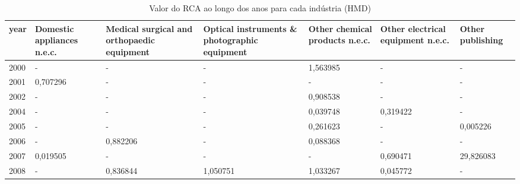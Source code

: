 \begin{table}
\centering
\caption{Valor do RCA ao longo dos anos para cada indústria (HMD)}
\begin{tabular}{p{1cm}p{2cm}p{2cm}p{2cm}p{2cm}p{2cm}p{2cm}}
\toprule
 year &  Domestic appliances n.e.c. &  Medical surgical and orthopaedic equipment &  Optical instruments \& photographic equipment &  Other chemical products n.e.c. &  Other electrical equipment n.e.c. &  Other publishing \\
\midrule
 2000 &                           - &                                           - &                                             - &                        1,563985 &                                  - &                 - \\
 2001 &                    0,707296 &                                           - &                                             - &                               - &                                  - &                 - \\
 2002 &                           - &                                           - &                                             - &                        0,908538 &                                  - &                 - \\
 2004 &                           - &                                           - &                                             - &                        0,039748 &                           0,319422 &                 - \\
 2005 &                           - &                                           - &                                             - &                        0,261623 &                                  - &          0,005226 \\
 2006 &                           - &                                    0,882206 &                                             - &                        0,088368 &                                  - &                 - \\
 2007 &                    0,019505 &                                           - &                                             - &                               - &                           0,690471 &         29,826083 \\
 2008 &                           - &                                    0,836844 &                                      1,050751 &                        1,033267 &                           0,045772 &                 - \\

\end{tabular}
\end{table}
